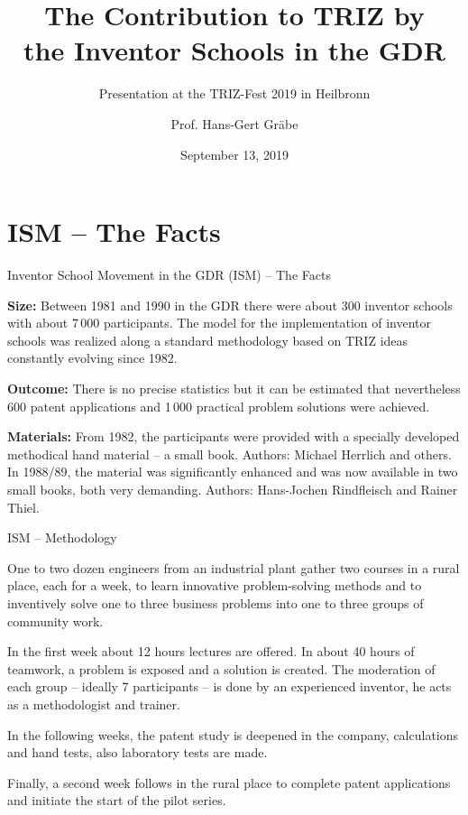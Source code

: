 \documentclass[11pt]{beamer}
\title[The Inventor School Movement in the GDR]{The Contribution to TRIZ by\\ 
  the Inventor Schools in the GDR}
\subtitle{Presentation at the TRIZ-Fest 2019 in Heilbronn}
\author[Hans-Gert Gr\"abe]{Prof. Hans-Gert Gräbe}
\institute{Institut f\"ur Informatik, Universit\"at Leipzig,\\
  \url{http://bis.informatik.uni-leipzig.de/HansGertGraebe/}}
\date{September 13, 2019}
\begin{document}
\begin{frame}
\maketitle
\end{frame}

\section{ISM -- The Facts}
\begin{frame}{Inventor School Movement in the GDR (ISM) -- The Facts}
  \small
  
  \textbf{Size:} Between 1981 and 1990 in the GDR there were about 300
  inventor schools with about 7\,000 participants. The model for the
  implementation of inventor schools was realized along a standard methodology
  based on TRIZ ideas constantly evolving since 1982.

  \textbf{Outcome:} There is no precise statistics but it can be estimated
  that nevertheless 600 patent applications and 1\,000 practical problem
  solutions were achieved.
  
  \textbf{Materials:} From 1982, the participants were provided with a
  specially developed methodical hand material -- a small book. Authors:
  Michael Herrlich and others. In 1988/89, the material was significantly
  enhanced and was now available in two small books, both very demanding.
  Authors: Hans-Jochen Rindfleisch and Rainer Thiel.

\end{frame}

\begin{frame}{ISM -- Methodology}
  \small

  One to two dozen engineers from an industrial plant gather two courses in a
  rural place, each for a week, to learn innovative problem-solving methods
  and to inventively solve one to three business problems into one to three
  groups of community work.

  In the first week about 12 hours lectures are offered. In about 40 hours of
  teamwork, a problem is exposed and a solution is created. The moderation of
  each group -- ideally 7 participants -- is done by an experienced inventor,
  he acts as a methodologist and trainer.

  In the following weeks, the patent study is deepened in the company,
  calculations and hand tests, also laboratory tests are made.

  Finally, a second week follows in the rural place to complete patent
  applications and initiate the start of the pilot series.

\end{frame}
\end{document}

